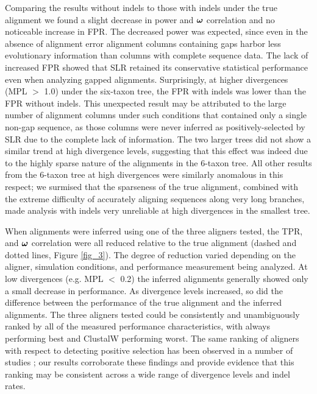 \documentclass{article}
\begin{document}
Comparing the results without indels to those with indels under the
true alignment we found a slight decrease in power and $\bm{\omega}$
correlation and no noticeable increase in FPR. The decreased power was
expected, since even in the absence of alignment error alignment
columns containing gaps harbor less evolutionary information than
columns with complete sequence data. The lack of increased FPR showed
that SLR retained its conservative statistical performance even when
analyzing gapped alignments. Surprisingly, at higher divergences (MPL
$>$ 1.0) under the six-taxon tree, the FPR with indels was lower than
the FPR without indels. This unexpected result may be attributed to
the large number of alignment columns under such conditions that
contained only a single non-gap sequence, as those columns were never
inferred as positively-selected by SLR due to the complete lack of
information. The two larger trees did not show a similar trend at high
divergence levels, suggesting that this effect was indeed due to the
highly sparse nature of the alignments in the 6-taxon tree. All other
results from the 6-taxon tree at high divergences were similarly
anomalous in this respect; we surmised that the sparseness of the true
alignment, combined with the extreme difficulty of accurately aligning
sequences along very long branches, made \sw analysis with indels very
unreliable at high divergences in the smallest tree.

When alignments were inferred using one of the three aligners tested,
the TPR, \tpr{} and $\bm{\omega}$ correlation were all reduced relative to
the true alignment (dashed and dotted lines, Figure \ref{fig_3}). The
degree of reduction varied depending on the aligner, simulation
conditions, and performance measurement being analyzed. At low
divergences (e.g. MPL $<$ 0.2) the inferred alignments generally
showed only a small decrease in performance. As divergence levels
increased, so did the difference between the performance of the true
alignment and the inferred alignments. The three aligners tested could
be consistently and unambiguously ranked by all of the measured
performance characteristics, with \prankc always performing best and
ClustalW performing worst. The same ranking of aligners with respect
to detecting positive selection has been observed in a number of
studies
\citep{Fletcher2010Effect,Markova-Raina2011High,Privman2011Improving};
our results corroborate these findings and provide evidence that this
ranking may be consistent across a wide range of divergence levels and
indel rates.
\end{document}
